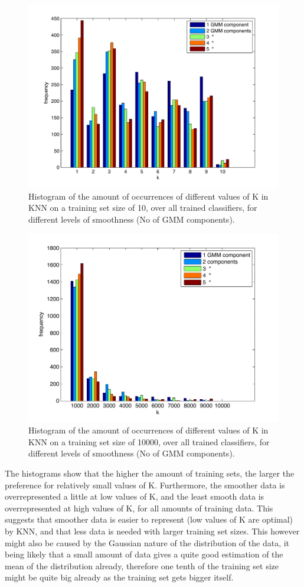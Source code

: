 \documentclass[a4paper]{article}
\begin{document}
\begin{figure}[htb]
    \centering
    \includegraphics[width=.9\textwidth]{Hist10.pdf}
    \caption{Histogram of the amount of occurrences of different values of K in KNN on a training set size of 10, over all trained classifiers, for different levels of smoothness (No of GMM components). \label{fig:hist10}}
\end{figure}

\begin{figure}[htb]
    \centering
    \includegraphics[width=.9\textwidth]{Hist10000.pdf}
    \caption{Histogram of the amount of occurrences of different values of K in KNN on a training set size of 10000, over all trained classifiers, for different levels of smoothness (No of GMM components). \label{fig:hist10000}}
\end{figure}

The histograms show that the higher the amount of training sets, the larger the preference for relatively small values of K. Furthermore, the smoother data is overrepresented a little at low values of K, and the least smooth data is overrepresented at high values of K, for all amounts of training data. This suggests that smoother data is easier to represent (low values of K are optimal) by KNN, and that less data is needed with larger training set sizes. This however might also be caused by the Gaussian nature of the distribution of the data, it being likely that a small amount of data gives a quite good estimation of the mean of the distribution already, therefore one tenth of the training set size might be quite big already as the training set gets bigger itself. 
\end{document}
